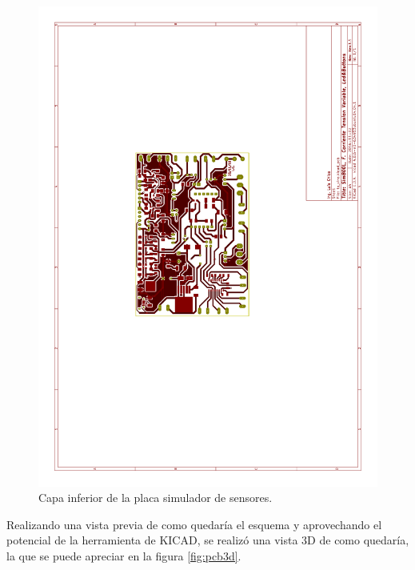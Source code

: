 \begin{figure}[!hp]
  \centering
  \includegraphics[page=2,angle=270,clip,trim=5.5cm 10cm 7.7cm 8.5cm]{./Figures/pcb_layer.pdf}
  \caption{Capa inferior de la placa simulador de sensores.}
  \label{fig:layer_inf}
\end{figure}

Realizando una vista previa de como quedaría el esquema y aprovechando el potencial de la herramienta de KICAD, se realizó una vista 3D de como quedaría, la que se puede apreciar en la figura \ref{fig:pcb3d}.

